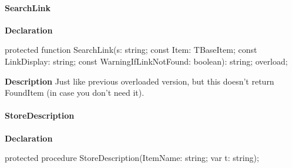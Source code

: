 \documentclass{report}
\newif\ifpdf
\begin{document}
\paragraph*{SearchLink}\hspace*{\fill}

\label{PasDoc_Gen.TDocGenerator-SearchLink}
\begin{list}{}{
\setlength{\itemindent}{0cm}
\setlength{\listparindent}{0cm}
\setlength{\leftmargin}{\evensidemargin}
\addtolength{\leftmargin}{\tmplength}
\settowidth{\labelsep}{X}
\addtolength{\leftmargin}{\labelsep}
\setlength{\labelwidth}{\tmplength}
}
\item[\textbf{Declaration}\hfill]
\ifpdf
\begin{flushleft}
\fi
\begin{ttfamily}
protected function SearchLink(s: string; const Item: TBaseItem; const LinkDisplay: string; const WarningIfLinkNotFound: boolean): string; overload;\end{ttfamily}

\ifpdf
\end{flushleft}
\fi

\par
\item[\textbf{Description}]
Just like previous overloaded version, but this doesn't return FoundItem (in case you don't need it).

\end{list}
\paragraph*{StoreDescription}\hspace*{\fill}

\label{PasDoc_Gen.TDocGenerator-StoreDescription}
\begin{list}{}{
\setlength{\itemindent}{0cm}
\setlength{\listparindent}{0cm}
\setlength{\leftmargin}{\evensidemargin}
\addtolength{\leftmargin}{\tmplength}
\settowidth{\labelsep}{X}
\addtolength{\leftmargin}{\labelsep}
\setlength{\labelwidth}{\tmplength}
}
\item[\textbf{Declaration}\hfill]
\ifpdf
\begin{flushleft}
\fi
\begin{ttfamily}
protected procedure StoreDescription(ItemName: string; var t: string);\end{ttfamily}

\ifpdf
\end{flushleft}
\fi

\end{list}
\end{document}
